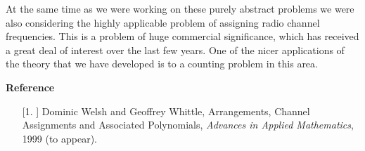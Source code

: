 \documentclass[12pt,leqno,bbold]{article}
\begin{document}
At the same time as we were working on these purely abstract
problems we were also considering the highly applicable problem of assigning
radio channel frequencies.  This is a problem of huge commercial significance,
which has received a great deal of interest over the last few years.  
One of the nicer
applications of the theory that we have developed is to a
counting problem in this area.  

\begin{center} {\bf Reference} \end{center}

\begin{enumerate}
\item[[1.]]  Dominic Welsh and Geoffrey Whittle, Arrangements, Channel
Assignments and Associated Polynomials, {\it Advances in Applied Mathematics},
1999 (to appear).
\end{enumerate}
\end{document}
